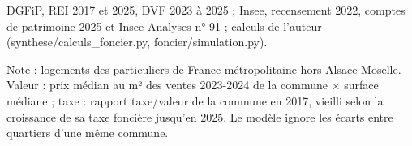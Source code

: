 DGFiP, REI 2017 et 2025, DVF 2023 à 2025 ; Insee, recensement 2022, comptes de patrimoine 2025 et Insee Analyses n° 91 ; calculs de l'auteur (synthese/calculs\_foncier.py, foncier/simulation.py).\par Note : logements des particuliers de France métropolitaine hors Alsace-Moselle. Valeur : prix médian au m² des ventes 2023-2024 de la commune $\times$ surface médiane ; taxe : rapport taxe/valeur de la commune en 2017, vieilli selon la croissance de sa taxe foncière jusqu'en 2025. Le modèle ignore les écarts entre quartiers d'une même commune.
